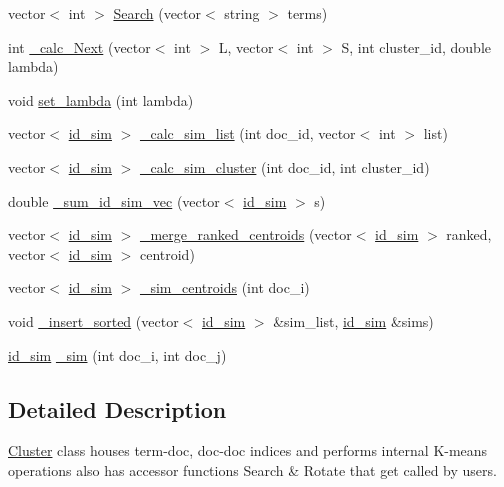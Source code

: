 \begin{DoxyCompactItemize}
\item 
vector$<$ int $>$ \hyperlink{classCluster_a76ea6ab6cd052481dcbd7b0d8ceb0180}{Search} (vector$<$ string $>$ terms)
\item 
int \hyperlink{classCluster_a5e088a6dfdd68195d483f910fed056ad}{\_\-calc\_\-Next} (vector$<$ int $>$ L, vector$<$ int $>$ S, int cluster\_\-id, double lambda)
\item 
void \hyperlink{classCluster_a51bc8f180218e3c557b5c5f3384bb47b}{set\_\-lambda} (int lambda)
\item 
vector$<$ \hyperlink{structid__sim}{id\_\-sim} $>$ \hyperlink{classCluster_a09c17f5cdfcb4fb272ae78f8aeff5b35}{\_\-calc\_\-sim\_\-list} (int doc\_\-id, vector$<$ int $>$ list)
\item 
vector$<$ \hyperlink{structid__sim}{id\_\-sim} $>$ \hyperlink{classCluster_a3d867fe0143427ef9b23a1530df04aee}{\_\-calc\_\-sim\_\-cluster} (int doc\_\-id, int cluster\_\-id)
\item 
double \hyperlink{classCluster_a896a946d690baf53a822a1481329b03b}{\_\-sum\_\-id\_\-sim\_\-vec} (vector$<$ \hyperlink{structid__sim}{id\_\-sim} $>$ s)
\item 
vector$<$ \hyperlink{structid__sim}{id\_\-sim} $>$ \hyperlink{classCluster_ac70926befde63be5cc6da346d6d7006a}{\_\-merge\_\-ranked\_\-centroids} (vector$<$ \hyperlink{structid__sim}{id\_\-sim} $>$ ranked, vector$<$ \hyperlink{structid__sim}{id\_\-sim} $>$ centroid)
\item 
vector$<$ \hyperlink{structid__sim}{id\_\-sim} $>$ \hyperlink{classCluster_ad080eedbefc0ca9a3a66dded18226a88}{\_\-sim\_\-centroids} (int doc\_\-i)
\item 
void \hyperlink{classCluster_a447f84a585288aec46dfdde042aa6903}{\_\-insert\_\-sorted} (vector$<$ \hyperlink{structid__sim}{id\_\-sim} $>$ \&sim\_\-list, \hyperlink{structid__sim}{id\_\-sim} \&sims)
\item 
\hyperlink{structid__sim}{id\_\-sim} \hyperlink{classCluster_ae11667a951be1260088de1ff32a41bcf}{\_\-sim} (int doc\_\-i, int doc\_\-j)
\end{DoxyCompactItemize}


\subsection{Detailed Description}
\hyperlink{classCluster}{Cluster} class houses term-\/doc, doc-\/doc indices and performs internal K-\/means operations also has accessor functions Search \& Rotate that get called by users. 

